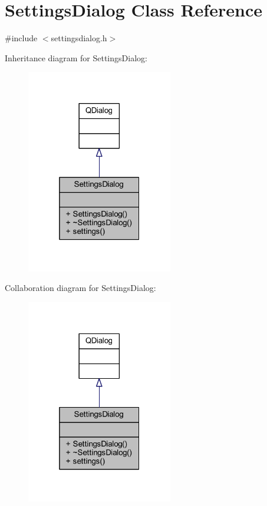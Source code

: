 \hypertarget{a00022}{\section{Settings\+Dialog Class Reference}
\label{a00022}
}


{\ttfamily \#include $<$settingsdialog.\+h$>$}



Inheritance diagram for Settings\+Dialog\+:
\nopagebreak
\begin{figure}[H]
\begin{center}
\leavevmode
\includegraphics[width=181pt]{d8/d17/a00304}
\end{center}
\end{figure}


Collaboration diagram for Settings\+Dialog\+:
\nopagebreak
\begin{figure}[H]
\begin{center}
\leavevmode
\includegraphics[width=181pt]{d3/d07/a00305}
\end{center}
\end{figure}
